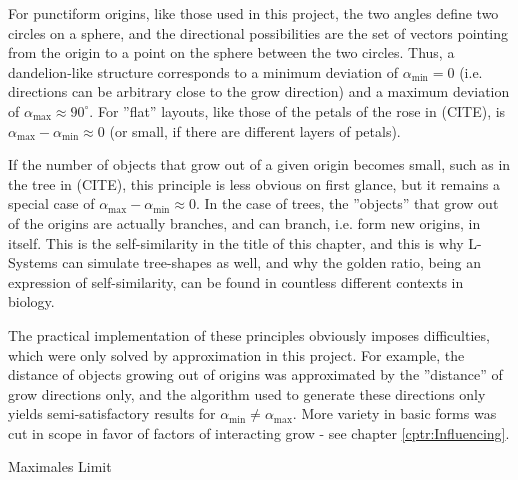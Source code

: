 \documentclass[11pt]{scrartcl}
\begin{document}
For punctiform origins, like those used in this project, the two angles define two circles on a sphere, and the directional possibilities are the set of vectors pointing from the origin to a point on the sphere between the two circles. Thus, a dandelion-like structure corresponds to a minimum deviation of $\alpha_\text{min} = 0$ (i.e. directions can be arbitrary close to the grow direction) and a maximum deviation of 
$\alpha_\text{max} \approx 90^\circ$. For ''flat'' layouts, like those of the petals of the rose in (CITE), 
is $\alpha_\text{max} - \alpha_\text{min} \approx 0$ (or small, if there are different layers of petals).

If the number of objects that grow out of a given origin becomes small, such as in the tree in (CITE), this principle is less obvious on first glance, but it remains a special case of $\alpha_\text{max} - \alpha_\text{min} \approx 0$. In the case of trees, the ''objects'' that grow out of the origins are actually branches, and can branch, i.e. form new origins, in itself. This is the self-similarity in the title of this chapter, and this is why L-Systems can simulate tree-shapes as well, and why the golden ratio, being an expression of self-similarity, can be found in countless different contexts in biology.

The practical implementation of these principles obviously imposes difficulties, which were only solved by approximation in this project. For example, the distance of objects growing out of origins was approximated by the ''distance'' of grow directions only, and the algorithm used to generate these directions only yields semi-satisfactory results for $\alpha_\text{min} \neq \alpha_\text{max}$. More variety in basic forms was cut in scope in favor of factors of interacting grow - see chapter \ref{cptr:Influencing}.

Maximales Limit
\end{document}
